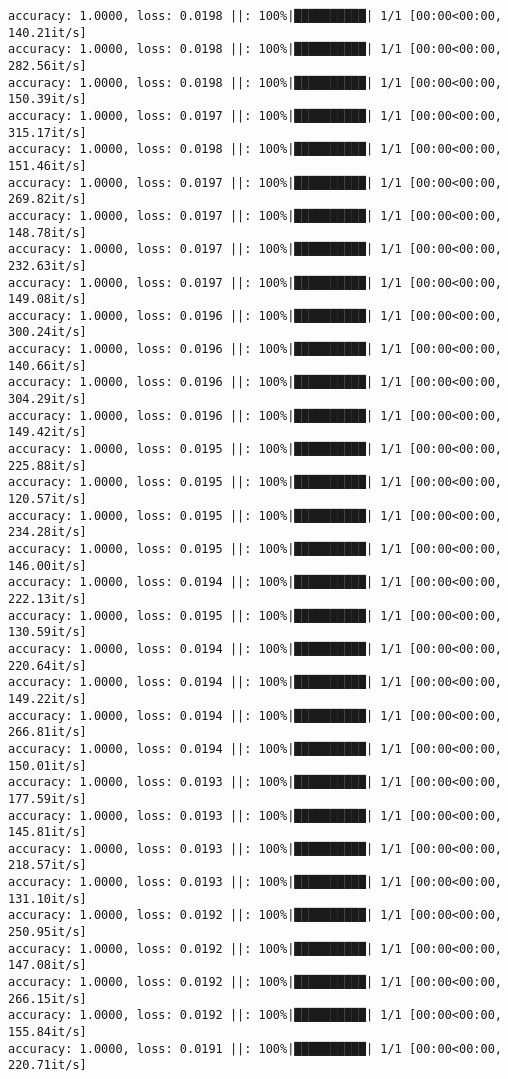 \documentclass[
]{article}
\begin{document}
\begin{verbatim}
accuracy: 1.0000, loss: 0.0198 ||: 100%|██████████| 1/1 [00:00<00:00, 140.21it/s]
accuracy: 1.0000, loss: 0.0198 ||: 100%|██████████| 1/1 [00:00<00:00, 282.56it/s]
accuracy: 1.0000, loss: 0.0198 ||: 100%|██████████| 1/1 [00:00<00:00, 150.39it/s]
accuracy: 1.0000, loss: 0.0197 ||: 100%|██████████| 1/1 [00:00<00:00, 315.17it/s]
accuracy: 1.0000, loss: 0.0198 ||: 100%|██████████| 1/1 [00:00<00:00, 151.46it/s]
accuracy: 1.0000, loss: 0.0197 ||: 100%|██████████| 1/1 [00:00<00:00, 269.82it/s]
accuracy: 1.0000, loss: 0.0197 ||: 100%|██████████| 1/1 [00:00<00:00, 148.78it/s]
accuracy: 1.0000, loss: 0.0197 ||: 100%|██████████| 1/1 [00:00<00:00, 232.63it/s]
accuracy: 1.0000, loss: 0.0197 ||: 100%|██████████| 1/1 [00:00<00:00, 149.08it/s]
accuracy: 1.0000, loss: 0.0196 ||: 100%|██████████| 1/1 [00:00<00:00, 300.24it/s]
accuracy: 1.0000, loss: 0.0196 ||: 100%|██████████| 1/1 [00:00<00:00, 140.66it/s]
accuracy: 1.0000, loss: 0.0196 ||: 100%|██████████| 1/1 [00:00<00:00, 304.29it/s]
accuracy: 1.0000, loss: 0.0196 ||: 100%|██████████| 1/1 [00:00<00:00, 149.42it/s]
accuracy: 1.0000, loss: 0.0195 ||: 100%|██████████| 1/1 [00:00<00:00, 225.88it/s]
accuracy: 1.0000, loss: 0.0195 ||: 100%|██████████| 1/1 [00:00<00:00, 120.57it/s]
accuracy: 1.0000, loss: 0.0195 ||: 100%|██████████| 1/1 [00:00<00:00, 234.28it/s]
accuracy: 1.0000, loss: 0.0195 ||: 100%|██████████| 1/1 [00:00<00:00, 146.00it/s]
accuracy: 1.0000, loss: 0.0194 ||: 100%|██████████| 1/1 [00:00<00:00, 222.13it/s]
accuracy: 1.0000, loss: 0.0195 ||: 100%|██████████| 1/1 [00:00<00:00, 130.59it/s]
accuracy: 1.0000, loss: 0.0194 ||: 100%|██████████| 1/1 [00:00<00:00, 220.64it/s]
accuracy: 1.0000, loss: 0.0194 ||: 100%|██████████| 1/1 [00:00<00:00, 149.22it/s]
accuracy: 1.0000, loss: 0.0194 ||: 100%|██████████| 1/1 [00:00<00:00, 266.81it/s]
accuracy: 1.0000, loss: 0.0194 ||: 100%|██████████| 1/1 [00:00<00:00, 150.01it/s]
accuracy: 1.0000, loss: 0.0193 ||: 100%|██████████| 1/1 [00:00<00:00, 177.59it/s]
accuracy: 1.0000, loss: 0.0193 ||: 100%|██████████| 1/1 [00:00<00:00, 145.81it/s]
accuracy: 1.0000, loss: 0.0193 ||: 100%|██████████| 1/1 [00:00<00:00, 218.57it/s]
accuracy: 1.0000, loss: 0.0193 ||: 100%|██████████| 1/1 [00:00<00:00, 131.10it/s]
accuracy: 1.0000, loss: 0.0192 ||: 100%|██████████| 1/1 [00:00<00:00, 250.95it/s]
accuracy: 1.0000, loss: 0.0192 ||: 100%|██████████| 1/1 [00:00<00:00, 147.08it/s]
accuracy: 1.0000, loss: 0.0192 ||: 100%|██████████| 1/1 [00:00<00:00, 266.15it/s]
accuracy: 1.0000, loss: 0.0192 ||: 100%|██████████| 1/1 [00:00<00:00, 155.84it/s]
accuracy: 1.0000, loss: 0.0191 ||: 100%|██████████| 1/1 [00:00<00:00, 220.71it/s]

\end{verbatim}
\end{document}

